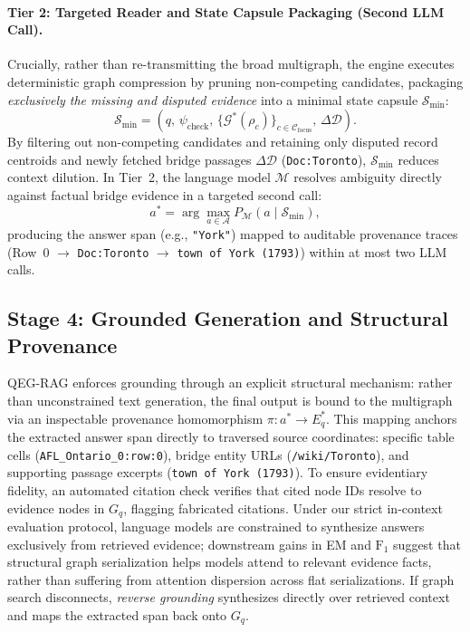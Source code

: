 \documentclass[runningheads]{llncs}
\begin{document}
\paragraph{Tier 2: Targeted Reader and State Capsule Packaging (Second LLM Call).}
Crucially, rather than re-transmitting the broad multigraph, the engine executes deterministic graph compression by pruning non-competing candidates, packaging \emph{exclusively the missing and disputed evidence} into a minimal state capsule $\mathcal{S}_{\min}$:
\begin{equation}
\label{eq:l2-capsule}
\mathcal{S}_{\min} = \left( q, \, \psi_{\text{check}}, \, \{ \mathcal{G}^*(\rho_c) \}_{c \in \mathcal{C}_{\text{focus}}}, \, \Delta \mathcal{D} \right).
\end{equation}
By filtering out non-competing candidates and retaining only disputed record centroids and newly fetched bridge passages $\Delta \mathcal{D}$ (\texttt{Doc:Toronto}), $\mathcal{S}_{\min}$ reduces context dilution. In Tier~2, the language model $\mathcal{M}$ resolves ambiguity directly against factual bridge evidence in a targeted second call:
\begin{equation}
a^* = \arg\max_{a \in \mathcal{A}} P_{\mathcal{M}}(a \mid \mathcal{S}_{\min}),
\end{equation}
producing the answer span (e.g., \texttt{"York"}) mapped to auditable provenance traces (Row~0 $\to$ \texttt{Doc:Toronto} $\to$ \texttt{town of York (1793)}) within at most two LLM calls.

\subsection{Stage 4: Grounded Generation and Structural Provenance}
\label{sec:method-answer}
QEG-RAG enforces grounding through an explicit structural mechanism: rather than unconstrained text generation, the final output is bound to the multigraph via an inspectable provenance homomorphism $\pi: a^* \rightarrow E_q^*$. This mapping anchors the extracted answer span directly to traversed source coordinates: specific table cells (\texttt{AFL\_Ontario\_0:row:0}), bridge entity URLs (\texttt{/wiki/Toronto}), and supporting passage excerpts (\texttt{town of York (1793)}). To ensure evidentiary fidelity, an automated citation check verifies that cited node IDs resolve to evidence nodes in $G_q$, flagging fabricated citations. Under our strict in-context evaluation protocol, language models are constrained to synthesize answers exclusively from retrieved evidence; downstream gains in EM and $\text{F}_1$ suggest that structural graph serialization helps models attend to relevant evidence facts, rather than suffering from attention dispersion across flat serializations. If graph search disconnects, \emph{reverse grounding} synthesizes directly over retrieved context and maps the extracted span back onto $G_q$.
\end{document}
